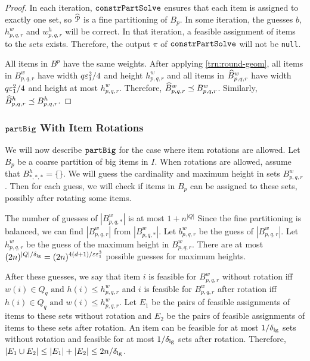 \rthmPartBigTime*

\rthmPartBig*
\begin{proof}
In each iteration, $\operatorname{\mathtt{constrPartSolve}}$ ensures that each item is assigned to exactly one set,
so $\widehat{\mathcal{P}}$ is a fine partitioning of $B_p$.
In some iteration, the guesses $b$, $h^w_{p,q,r}$ and $w^h_{p,q,r}$ will be correct.
In that iteration, a feasible assignment of items to the sets exists.
Therefore, the output $\pi$ of $\operatorname{\mathtt{constrPartSolve}}$ will not be \texttt{null}.

All items in $B^p$ have the same weights. After applying \cref{trn:round-geom},
all items in $B^w_{p,q,r}$ have width $q\varepsilon_1^2/4$ and height $h^w_{p,q,r}$
and all items in $\widehat{B}^w_{p,q,r}$ have width $q\varepsilon_1^2/4$ and
height at most $h^w_{p,q,r}$.
Therefore, $\widehat{B}^w_{p,q,r} \preceq B^w_{p,q,r}$.
Similarly, $\widehat{B}^h_{p,q,r} \preceq B^h_{p,q,r}$.
\end{proof}

\subsubsection{\texorpdfstring{$\operatorname{\mathtt{partBig}}$}{partBig} With Item Rotations}
\label{sec:gv-rbbp:part-big:part-big-rot}

We will now describe $\operatorname{\mathtt{partBig}}$ for the case where item rotations are allowed.
Let $B_p$ be a coarse partition of big items in $I$.
When rotations are allowed, assume \wLoG{} that $B^h_{*,*,*} = \{\}$.
We will guess the cardinality and maximum height in sets $B^w_{p,q,r}$.
Then for each guess, we will check if items in $B_p$ can be assigned to these sets,
possibly after rotating some items.

The number of guesses of $|B^w_{p,q,*}|$ is at most $1 + n^{|Q|}$
Since the fine partitioning is balanced, we can find $|B^w_{p,q,r}|$ from $|B^w_{p,q,*}|$.
Let $b^w_{p,q,r}$ be the guess of $|B^w_{p,q,r}|$.
Let $h^w_{p,q,r}$ be the guess of the maximum height in $B^w_{p,q,r}$.
There are at most ${\displaystyle (2n)^{|Q|/\delta_{\mathrm{lg}}} = (2n)^{4(d+1)/\varepsilon\varepsilon_1^3}}$
possible guesses for maximum heights.

After these guesses, we say that item $i$ is feasible for $B^w_{p,q,r}$ without rotation iff
$w(i) \in Q_q \textrm{ and } h(i) \le h^w_{p,q,r}$
and $i$ is feasible for $B^w_{p,q,r}$ after rotation iff
$h(i) \in Q_q \textrm{ and } w(i) \le h^w_{p,q,r}$.
Let $E_1$ be the pairs of feasible assignments of items to these sets without rotation
and $E_2$ be the pairs of feasible assignments of items to these sets after rotation.
An item can be feasible for at most $1/\delta_{\mathrm{lg}}$ sets without rotation
and feasible for at most $1/\delta_{\mathrm{lg}}$ sets after rotation.
Therefore, $|E_1 \cup E_2| \le |E_1| + |E_2| \le 2n/\delta_{\mathrm{lg}}$.

